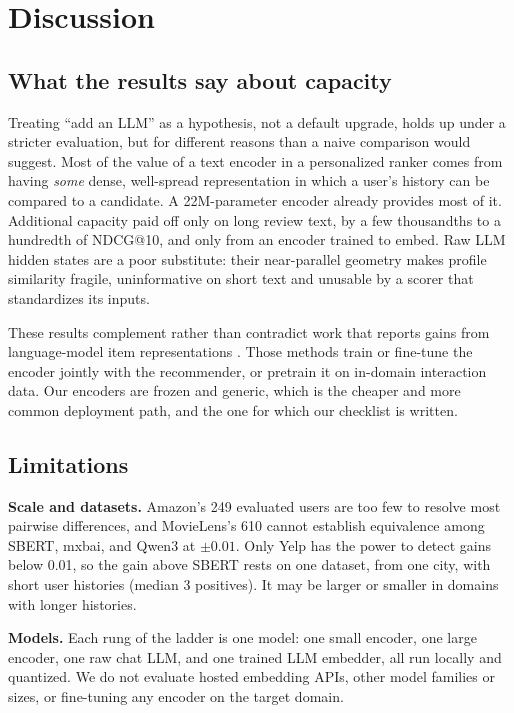 \section{Discussion}
\label{sec:discussion}

\subsection{What the results say about capacity}
Treating ``add an LLM'' as a hypothesis, not a default upgrade, holds up
under a stricter evaluation, but for different reasons than a naive
comparison would suggest. Most of the value of a text encoder in a
personalized ranker comes from having \emph{some} dense, well-spread
representation in which a user's history can be compared to a
candidate. A 22M-parameter encoder already provides most of it.
Additional capacity paid off only on long review text, by a few
thousandths to a hundredth of NDCG@10, and only from an encoder trained
to embed. Raw LLM hidden states are a poor substitute: their
near-parallel geometry makes profile similarity fragile, uninformative
on short text and unusable by a scorer that standardizes its inputs.

These results complement rather than contradict work that reports gains
from language-model item representations
\cite{unisrec, recformer, yuan-id-vs-modality, harte-llmseqrec,
amazon-reviews-2023}. Those methods train or fine-tune the encoder
jointly with the recommender, or pretrain it on in-domain interaction
data. Our encoders are frozen and generic, which is the cheaper and
more common deployment path, and the one for which our checklist is
written.

\subsection{Limitations}
\label{sec:limitations}
\textbf{Scale and datasets.} Amazon's 249 evaluated users are too few
to resolve most pairwise differences, and MovieLens's 610 cannot
establish equivalence among SBERT, mxbai, and Qwen3 at $\pm0.01$. Only
Yelp has the power to detect gains below 0.01, so the gain above SBERT
rests on one dataset, from one city, with short user histories (median
3 positives). It may be larger or smaller in domains with longer
histories.

\textbf{Models.} Each rung of the ladder is one model: one small
encoder, one large encoder, one raw chat LLM, and one trained LLM
embedder, all run locally and quantized. We do not evaluate hosted
embedding APIs, other model families or sizes, or fine-tuning any
encoder on the target domain.

